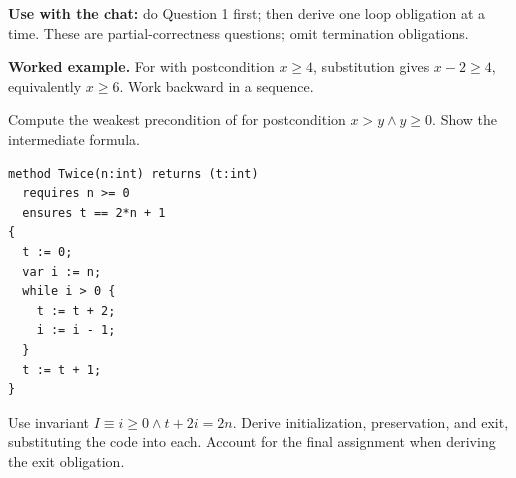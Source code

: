 


\textbf{Use with the chat:} do Question 1 first; then derive one loop obligation
at a time. These are partial-correctness questions; omit termination obligations.

\textbf{Worked example.} For  with postcondition $x\geq4$,
substitution gives $x-2\geq4$, equivalently $x\geq6$. Work backward in a sequence.

Compute the weakest precondition of 
for postcondition $x>y\land y\geq0$. Show the intermediate formula.

\par\noindent\begin{minipage}{\linewidth}
\begin{lstlisting}
method Twice(n:int) returns (t:int)
  requires n >= 0
  ensures t == 2*n + 1
{
  t := 0;
  var i := n;
  while i > 0 {
    t := t + 2;
    i := i - 1;
  }
  t := t + 1;
}
\end{lstlisting}
\end{minipage}\par
Use invariant $I\equiv i\geq0\land t+2i=2n$.
Derive initialization, preservation, and exit, substituting the code into each.
Account for the final assignment when deriving the exit obligation.


